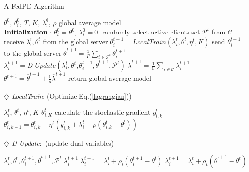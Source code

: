 \begin{algorithm}[t]
\small
	\renewcommand{\algorithmicrequire}{\textbf{Input:}}
	\renewcommand{\algorithmicensure}{\textbf{Output:}}
	\caption{A-FedPD Algorithm}
    \begin{multicols}{2}
	\begin{algorithmic}[1]
		\REQUIRE $\theta^0$, $\theta_i^0$, $T$, $K$, $\lambda_i^0$, $\rho$
		\ENSURE global average model\\
            \STATE \textbf{Initialization} : $\theta_i^0=\theta^0$, $\lambda_i^0=0$.
            \STATE randomly select active clients set $\mathcal{P}^t$ from $\mathcal{C}$
            \STATE receive $\lambda_i^t, \theta^t$ from the global server
            \STATE $\theta_i^{t+1} = \textit{LocalTrain}(\lambda_i^t, \theta^t, \eta^t, K)$
            \STATE send $\theta_i^{t+1}$ to the global server 
            \ENDFOR
            \STATE $\overline{\theta}^{t+1} = \frac{1}{P}\sum_{i\in\mathcal{P}^t}\theta_i^{t+1}$
            \STATE $\lambda_i^{t+1}=\textit{D-Update}(\lambda_i^t, \theta^t, \theta_i^{t+1}, \overline{\theta}^{t+1}, \mathcal{P}^t)$
            \STATE $\overline{\lambda}^{t+1} = \frac{1}{C}\sum_{i\in\mathcal{C}}\lambda_i^{t+1}$
            \STATE $\theta^{t+1} = \overline{\theta}^{t+1} + \frac{1}{\rho} \overline{\lambda}^{t+1}$
            \ENDFOR
            \STATE return global average model
	\end{algorithmic}
    \label{algorithm}
    \textit{$\diamondsuit$ LocalTrain}: (Optimize Eq.(\ref{lagrangian}))
    \begin{algorithmic}[1]
	\REQUIRE $\lambda_i^t$, $\theta^t$, $\eta^t$, $K$
	\ENSURE $\theta_{i,K}^t$
        \STATE calculate the stochastic gradient $g_{i,k}^t$
        \STATE $\theta_{i,k+1}^t = \theta_{i,k}^t - \eta^t(g_{i,k}^t + \lambda_i^t + \rho(\theta_{i,k}^t - \theta^t))$
        \ENDFOR
	\end{algorithmic}
	\label{algorithm:local_update}

    \vspace{0.4cm}
    \textit{$\diamondsuit$ D-Update}:~(update dual variables)
    \begin{algorithmic}[1]
    \REQUIRE $\lambda_i^t, \theta^t, \theta_i^{t+1}, \overline{\theta}^{t+1}, \mathcal{P}^t$
	\ENSURE $\lambda_i^{t+1}$
    \STATE $\lambda_i^{t+1} = \lambda_i^{t} + \rho_t(\theta_i^{t+1} - \theta^t)$
    \ELSE 
    \STATE $\lambda_i^{t+1} = \lambda_i^{t} + \rho_t(\overline{\theta}^{t+1} - \theta^t)$
    \ENDIF
    \end{algorithmic}
\label{algorithm:dual_update}
\end{multicols}
\vspace{-0.3cm}
\end{algorithm}  

